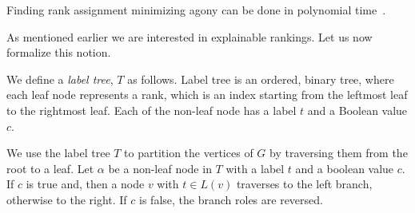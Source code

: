 Finding rank assignment minimizing agony can be done in polynomial time~\citep{gupte2011finding,nikolaj2017tiers}.

As mentioned earlier we are interested in explainable rankings. Let us now formalize this notion.

\begin{definition}
We define a \emph{label tree}, $T$ as follows. 
Label tree is an ordered, binary tree, where each leaf node represents a rank, which is an index starting from the leftmost leaf to the rightmost leaf. 
Each of the non-leaf node has a label $t$
and a Boolean value $c$.
\end{definition}

We use the label tree $T$ to partition the vertices of $G$ by traversing them
from the root to a leaf. Let $\alpha$ be a non-leaf node in $T$ with a label $t$ and a boolean value $c$.
If $c$ is true and, then a node $v$ with $t \in L(v)$ traverses to the left branch,
otherwise to the right. If $c$ is false, the branch roles are reversed.

